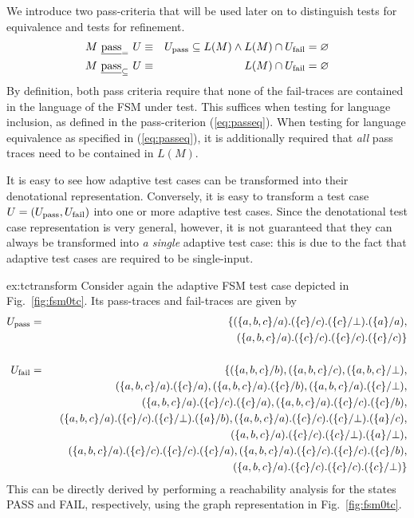 We introduce two pass-criteria that will be used later on to distinguish tests for equivalence and tests for refinement.
\begin{eqnarray}
M\ \underline{\text{pass}}_=\ U & \equiv & {U}_\text{pass} \subseteq L(M) \wedge L(M)\cap {U}_\text{fail} =\varnothing
\label{eq:passeq}
\\
M\ \underline{\text{pass}}_\subseteq\ U & \equiv & L(M)\cap {U}_\text{fail} =\varnothing
\label{eq:passred}
\end{eqnarray}
By definition, both pass criteria require that none of the fail-traces are contained
in the language of the FSM under test. This suffices when testing for language inclusion,
as defined in the pass-criterion (\ref{eq:passeq}).
When testing for language equivalence as specified in (\ref{eq:passeq}), it is additionally required that {\it all} pass traces need to be contained in $L(M)$.


It is easy to see how adaptive test cases can be transformed into their denotational representation. Conversely, it is easy to transform a test case $U = ({U}_\text{pass},{U}_\text{fail})$
into one or more adaptive test cases. Since the denotational test case representation
is very general, however, it is not guaranteed that they can always be transformed into {\it a single} adaptive test case: this is due to the fact that adaptive test cases
are required to be single-input.
\begin{example}{ex:tctransform}
Consider again the adaptive FSM test case depicted in Fig.~\ref{fig:fsm0tc}.
Its pass-traces and fail-traces are given by
\begin{eqnarray*}
\xpass U & =  & \{ (\{a,b,c\}/a).(\{c\}/c).(\{c\}/\bot).(\{a\}/a),
\\ & & \ \ (\{a,b,c\}/a).(\{c\}/c).(\{c\}/c).(\{c\}/c)
\}
\\ & & {~} \\
\xfail U & = & \{ (\{a,b,c\}/b), (\{a,b,c\}/c), (\{a,b,c\}/\bot),
\\ & & \ \ (\{a,b,c\}/a).(\{c\}/a), (\{a,b,c\}/a).(\{c\}/b), (\{a,b,c\}/a).(\{c\}/\bot),
\\ & & \ \ (\{a,b,c\}/a).(\{c\}/c).(\{c\}/a), (\{a,b,c\}/a).(\{c\}/c).(\{c\}/b),
\\ & & \ \ (\{a,b,c\}/a).(\{c\}/c).(\{c\}/\bot).(\{a\}/b),
(\{a,b,c\}/a).(\{c\}/c).(\{c\}/\bot).(\{a\}/c),
\\ & & \ \ 
(\{a,b,c\}/a).(\{c\}/c).(\{c\}/\bot).(\{a\}/\bot),
\\ & & \ \ (\{a,b,c\}/a).(\{c\}/c).(\{c\}/c).(\{c\}/a),
(\{a,b,c\}/a).(\{c\}/c).(\{c\}/c).(\{c\}/b),
\\ & & \ \ 
(\{a,b,c\}/a).(\{c\}/c).(\{c\}/c).(\{c\}/\bot)
\}
\end{eqnarray*}
This can be directly derived by performing a reachability analysis for the states PASS and FAIL, respectively, using the graph representation in Fig.~\ref{fig:fsm0tc}.
\end{example}



